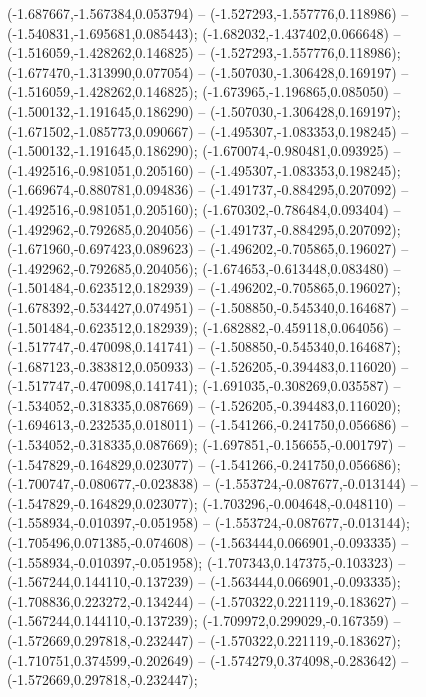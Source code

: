  (-1.687667,-1.567384,0.053794) -- (-1.527293,-1.557776,0.118986) -- (-1.540831,-1.695681,0.085443);
 (-1.682032,-1.437402,0.066648) -- (-1.516059,-1.428262,0.146825) -- (-1.527293,-1.557776,0.118986);
 (-1.677470,-1.313990,0.077054) -- (-1.507030,-1.306428,0.169197) -- (-1.516059,-1.428262,0.146825);
 (-1.673965,-1.196865,0.085050) -- (-1.500132,-1.191645,0.186290) -- (-1.507030,-1.306428,0.169197);
 (-1.671502,-1.085773,0.090667) -- (-1.495307,-1.083353,0.198245) -- (-1.500132,-1.191645,0.186290);
 (-1.670074,-0.980481,0.093925) -- (-1.492516,-0.981051,0.205160) -- (-1.495307,-1.083353,0.198245);
 (-1.669674,-0.880781,0.094836) -- (-1.491737,-0.884295,0.207092) -- (-1.492516,-0.981051,0.205160);
 (-1.670302,-0.786484,0.093404) -- (-1.492962,-0.792685,0.204056) -- (-1.491737,-0.884295,0.207092);
 (-1.671960,-0.697423,0.089623) -- (-1.496202,-0.705865,0.196027) -- (-1.492962,-0.792685,0.204056);
 (-1.674653,-0.613448,0.083480) -- (-1.501484,-0.623512,0.182939) -- (-1.496202,-0.705865,0.196027);
 (-1.678392,-0.534427,0.074951) -- (-1.508850,-0.545340,0.164687) -- (-1.501484,-0.623512,0.182939);
 (-1.682882,-0.459118,0.064056) -- (-1.517747,-0.470098,0.141741) -- (-1.508850,-0.545340,0.164687);
 (-1.687123,-0.383812,0.050933) -- (-1.526205,-0.394483,0.116020) -- (-1.517747,-0.470098,0.141741);
 (-1.691035,-0.308269,0.035587) -- (-1.534052,-0.318335,0.087669) -- (-1.526205,-0.394483,0.116020);
 (-1.694613,-0.232535,0.018011) -- (-1.541266,-0.241750,0.056686) -- (-1.534052,-0.318335,0.087669);
 (-1.697851,-0.156655,-0.001797) -- (-1.547829,-0.164829,0.023077) -- (-1.541266,-0.241750,0.056686);
 (-1.700747,-0.080677,-0.023838) -- (-1.553724,-0.087677,-0.013144) -- (-1.547829,-0.164829,0.023077);
 (-1.703296,-0.004648,-0.048110) -- (-1.558934,-0.010397,-0.051958) -- (-1.553724,-0.087677,-0.013144);
 (-1.705496,0.071385,-0.074608) -- (-1.563444,0.066901,-0.093335) -- (-1.558934,-0.010397,-0.051958);
 (-1.707343,0.147375,-0.103323) -- (-1.567244,0.144110,-0.137239) -- (-1.563444,0.066901,-0.093335);
 (-1.708836,0.223272,-0.134244) -- (-1.570322,0.221119,-0.183627) -- (-1.567244,0.144110,-0.137239);
 (-1.709972,0.299029,-0.167359) -- (-1.572669,0.297818,-0.232447) -- (-1.570322,0.221119,-0.183627);
 (-1.710751,0.374599,-0.202649) -- (-1.574279,0.374098,-0.283642) -- (-1.572669,0.297818,-0.232447);
